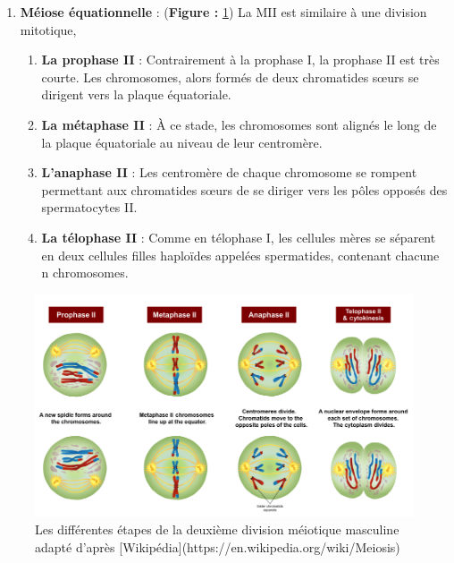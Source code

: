 \documentclass[12pt,twoside]{reedthesis}
\providecommand{\tightlist}{%
  \setlength{\itemsep}{0pt}\setlength{\parskip}{0pt}}
\theoremstyle{definition}
\theoremstyle{definition}
\theoremstyle{remark}
\begin{document}
  \begin{enumerate}
  \def\labelenumi{\arabic{enumi}.}
  \setcounter{enumi}{1}
  \tightlist
  \item
    \textbf{Méiose équationnelle} : (\textbf{Figure : }\ref{fig:meioseii})
    La MII est similaire à une division mitotique,
  
    \begin{enumerate}
    \def\labelenumii{\alph{enumii}.}
    \tightlist
    \item
      \textbf{La prophase II} : Contrairement à la prophase I, la prophase
      II est très courte. Les chromosomes, alors formés de deux
      chromatides sœurs se dirigent vers la plaque équatoriale.\\
    \item
      \textbf{La métaphase II} : À ce stade, les chromosomes sont alignés
      le long de la plaque équatoriale au niveau de leur centromère.\\
    \item
      \textbf{L'anaphase II} : Les centromère de chaque chromosome se
      rompent permettant aux chromatides sœurs de se diriger vers les
      pôles opposés des spermatocytes II.\\
    \item
      \textbf{La télophase II} : Comme en télophase I, les cellules mères
      se séparent en deux cellules filles haploïdes appelées spermatides,
      contenant chacune n chromosomes.
    \end{enumerate}
  \end{enumerate}
  
  \begin{figure}
  
  {\centering \includegraphics[scale=0.43]{figure/MeiosisII} 
  
  }
  
  \caption[Les différentes étapes de la deuxième division méiotique masculine adapté]{Les différentes étapes de la deuxième division méiotique masculine adapté d'après [Wikipédia](https://en.wikipedia.org/wiki/Meiosis)}\label{fig:meioseii}
  \end{figure}
  
\end{document}
